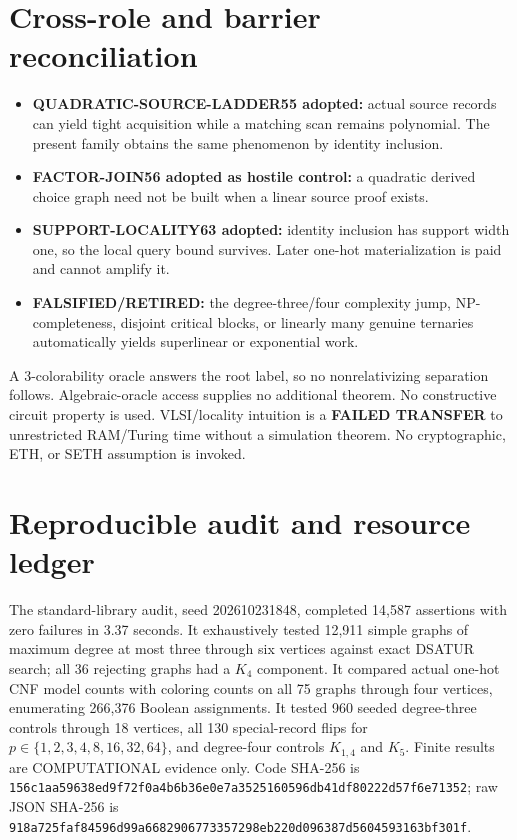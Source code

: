 \documentclass[11pt]{article}
\begin{document}
\section{Cross-role and barrier reconciliation}
\begin{itemize}
\item \textbf{QUADRATIC-SOURCE-LADDER55 adopted:} actual source records can
yield tight acquisition while a matching scan remains polynomial. The present
family obtains the same phenomenon by identity inclusion.
\item \textbf{FACTOR-JOIN56 adopted as hostile control:} a quadratic derived
choice graph need not be built when a linear source proof exists.
\item \textbf{SUPPORT-LOCALITY63 adopted:} identity inclusion has support
width one, so the local query bound survives. Later one-hot materialization is
paid and cannot amplify it.
\item \textbf{FALSIFIED/RETIRED:} the degree-three/four complexity jump,
NP-completeness, disjoint critical blocks, or linearly many genuine ternaries
automatically yields superlinear or exponential work.
\end{itemize}
A 3-colorability oracle answers the root label, so no nonrelativizing
separation follows. Algebraic-oracle access supplies no additional theorem.
No constructive circuit property is used. VLSI/locality intuition is a
\textbf{FAILED TRANSFER} to unrestricted RAM/Turing time without a simulation
theorem. No cryptographic, ETH, or SETH assumption is invoked.

\section{Reproducible audit and resource ledger}
The standard-library audit, seed 202610231848, completed 14,587 assertions
with zero failures in 3.37 seconds. It exhaustively tested 12,911 simple
graphs of maximum degree at most three through six vertices against exact
DSATUR search; all 36 rejecting graphs had a \(K_4\) component. It compared
actual one-hot CNF model counts with coloring counts on all 75 graphs through
four vertices, enumerating 266,376 Boolean assignments. It tested 960 seeded
degree-three controls through 18 vertices, all 130 special-record flips for
\(p\in\{1,2,3,4,8,16,32,64\}\), and degree-four controls \(K_{1,4}\) and
\(K_5\). Finite results are COMPUTATIONAL evidence only. Code SHA-256 is
\texttt{156c1aa59638ed9f72f0a4b6b36e0e7a3525160596db41df80222d57f6e71352};
raw JSON SHA-256 is
\texttt{918a725faf84596d99a6682906773357298eb220d096387d5604593163bf301f}.
\end{document}

